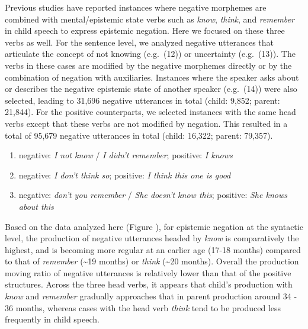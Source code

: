 \documentclass[
  english,
  man,floatsintext]{apa6}
\providecommand{\tightlist}{%
  \setlength{\itemsep}{0pt}\setlength{\parskip}{0pt}}
\begin{document}
Previous studies have reported instances where negative morphemes are combined with mental/epistemic state verbs such as \emph{know}, \emph{think}, and \emph{remember} in child speech to express epistemic negation. Here we focused on these three verbs as well. For the sentence level, we analyzed negative utterances that articulate the concept of not knowing (e.g.~(12)) or uncertainty (e.g.~(13)). The verbs in these cases are modified by the negative morphemes directly or by the combination of negation with auxiliaries. Instances where the speaker asks about or describes the negative epistemic state of another speaker (e.g.~(14)) were also selected, leading to 31,696 negative utterances in total (child: 9,852; parent: 21,844).
For the positive counterparts, we selected instances with the same head verbs except that these verbs are not modified by negation. This resulted in a total of 95,679 negative utterances in total (child: 16,322; parent: 79,357).

\begin{enumerate}
\def\labelenumi{(\arabic{enumi})}
\setcounter{enumi}{11}
\tightlist
\item
  negative: \emph{I not know} / \emph{I didn't remember}; positive: \emph{I knows}
\item
  negative: \emph{I don't think so}; positive: \emph{I think this one is good}
\item
  negative: \emph{don't you remember} / \emph{She doesn't know this}; positive: \emph{She knows about this}
\end{enumerate}

Based on the data analyzed here (Figure ), for epistemic negation at the syntactic level, the production of negative utterances headed by \emph{know} is comparatively the highest, and is becoming more regular at an earlier age (17-18 months) compared to that of \emph{remember} (\textasciitilde19 months) or \emph{think} (\textasciitilde20 months). Overall the production moving ratio of negative utterances is relatively lower than that of the positive structures. Across the three head verbs, it appears that child's production with \emph{know} and \emph{remember} gradually approaches that in parent production around 34 - 36 months, whereas cases with the head verb \emph{think} tend to be produced less frequently in child speech.
\end{document}
